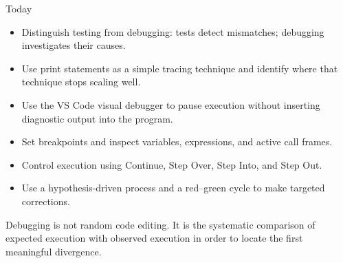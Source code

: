 \documentclass[aspectratio=169,10pt]{beamer}
\begin{document}
\makedecktitle

\begin{frame}{Today}
  \begin{itemize}
    \item Distinguish testing from debugging: tests detect mismatches; debugging investigates their causes.
    \item Use print statements as a simple tracing technique and identify where that technique stops scaling well.
    \item Use the VS Code visual debugger to pause execution without inserting diagnostic output into the program.
    \item Set breakpoints and inspect variables, expressions, and active call frames.
    \item Control execution using Continue, Step Over, Step Into, and Step Out.
    \item Use a hypothesis-driven process and a red--green cycle to make targeted corrections.
  \end{itemize}

  \begin{keyidea}
    Debugging is not random code editing. It is the systematic comparison of expected execution with observed execution in order to locate the first meaningful divergence.
  \end{keyidea}
\end{frame}

\end{document}
